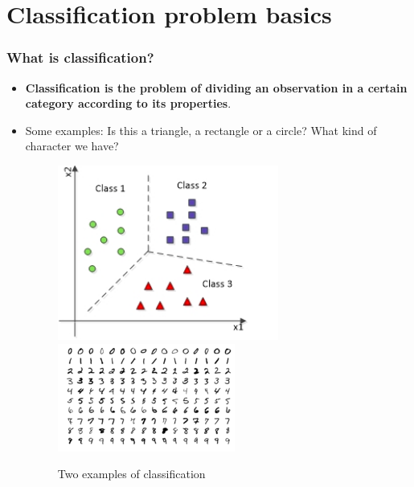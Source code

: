 \documentclass[9pt]{beamer}
\begin{document}
\section{Classification problem basics}
\begin{frame}
\frametitle{What is classification?}
\begin{itemize}
\item \textbf{Classification is the problem of dividing an observation in a certain category according to its properties}.
\item Some examples: Is this a triangle, a rectangle or a circle? What kind of character we have?
\vspace{10mm}
\begin{figure}[ht]
\includegraphics[scale=0.50]{images/classificationintroduction.png}
\includegraphics[scale=0.50]{images/Mnist.png}
\caption{Two examples of classification}
\end{figure}
\end{itemize}
\end{frame}
\end{document}
